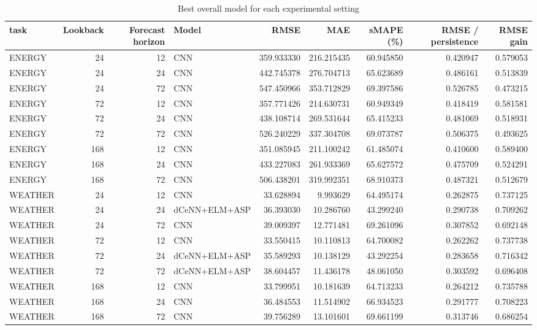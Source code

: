 \begin{table}
\caption{Best overall model for each experimental setting}
\begin{tabular}{lrrlrrrrr}
\toprule
task & Lookback & Forecast horizon & Model & RMSE & MAE & sMAPE (\%) & RMSE / persistence & RMSE gain \\
\midrule
ENERGY & 24 & 12 & CNN & 359.933330 & 216.215435 & 60.945850 & 0.420947 & 0.579053 \\
ENERGY & 24 & 24 & CNN & 442.745378 & 276.704713 & 65.623689 & 0.486161 & 0.513839 \\
ENERGY & 24 & 72 & CNN & 547.450966 & 353.712829 & 69.397586 & 0.526785 & 0.473215 \\
ENERGY & 72 & 12 & CNN & 357.771426 & 214.630731 & 60.949349 & 0.418419 & 0.581581 \\
ENERGY & 72 & 24 & CNN & 438.108714 & 269.531644 & 65.415233 & 0.481069 & 0.518931 \\
ENERGY & 72 & 72 & CNN & 526.240229 & 337.304708 & 69.073787 & 0.506375 & 0.493625 \\
ENERGY & 168 & 12 & CNN & 351.085945 & 211.100242 & 61.485074 & 0.410600 & 0.589400 \\
ENERGY & 168 & 24 & CNN & 433.227083 & 261.933369 & 65.627572 & 0.475709 & 0.524291 \\
ENERGY & 168 & 72 & CNN & 506.438201 & 319.992351 & 68.910373 & 0.487321 & 0.512679 \\
WEATHER & 24 & 12 & CNN & 33.628894 & 9.993629 & 64.495174 & 0.262875 & 0.737125 \\
WEATHER & 24 & 24 & dCeNN+ELM+ASP & 36.393030 & 10.286760 & 43.299240 & 0.290738 & 0.709262 \\
WEATHER & 24 & 72 & CNN & 39.009397 & 12.771481 & 69.261096 & 0.307852 & 0.692148 \\
WEATHER & 72 & 12 & CNN & 33.550415 & 10.110813 & 64.700082 & 0.262262 & 0.737738 \\
WEATHER & 72 & 24 & dCeNN+ELM+ASP & 35.589293 & 10.138129 & 43.292254 & 0.283658 & 0.716342 \\
WEATHER & 72 & 72 & dCeNN+ELM+ASP & 38.604457 & 11.436178 & 48.061050 & 0.303592 & 0.696408 \\
WEATHER & 168 & 12 & CNN & 33.799951 & 10.181639 & 64.713233 & 0.264212 & 0.735788 \\
WEATHER & 168 & 24 & CNN & 36.484553 & 11.514902 & 66.934523 & 0.291777 & 0.708223 \\
WEATHER & 168 & 72 & CNN & 39.756289 & 13.101601 & 69.661199 & 0.313746 & 0.686254 \\
\bottomrule
\end{tabular}
\end{table}
